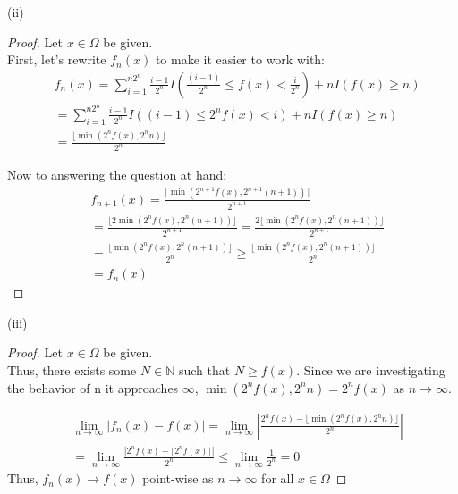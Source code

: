 \documentclass[12pt,letterpaper, onecolumn]{exam}
\newcommand{\nat}{\mathbb{N}}
\newcommand{\cutelim}{\lim\limits_{n\to\infty}}
\begin{document}
\begin{questions}
\begin{solution}
        (ii) 
        \begin{proof}
            Let $x \in \Omega$ be given. \\
            First, let's rewrite $f_n(x)$ to make it easier to work with:
            \begin{align*}
                &f_n(x) = \sum_{i = 1}^{n2^n} \frac{i - 1}{2^n} I(\frac{(i - 1)}{2^n} \leq f(x) < \frac{i}{2^n}) + n I(f(x) \geq n) \\
                & = \sum_{i = 1}^{n2^n} \frac{i - 1}{2^n} I((i - 1) \leq 2^nf(x) < i) + n I(f(x) \geq n) \\
                & = \frac{\lfloor \min(2^n f(x), 2^n n)\rfloor}{2^n}
            \end{align*}

            Now to answering the question at hand: 
            \begin{align*}
                &f_{n+1}(x) = \frac{\lfloor \min(2^{n+1} f(x), 2^{n+1} (n+1))\rfloor}{2^{n+1}} \\
                & = \frac{\lfloor 2\min(2^{n} f(x), 2^{n} (n+1))\rfloor}{2^{n+1}} = \frac{2\lfloor\min(2^{n} f(x), 2^{n} (n+1))\rfloor}{2^{n+1}} \\
                & = \frac{\lfloor\min(2^{n} f(x), 2^{n} (n+1))\rfloor}{2^{n}} \geq \frac{\lfloor\min(2^{n} f(x), 2^{n} (n+1))\rfloor}{2^{n}} \\
                & = f_n(x) 
            \end{align*}
        \end{proof}
        (iii) 
        \begin{proof}
            Let $x \in \Omega$ be given. \\
            Thus, there exists some $N \in \nat$ such that $N \geq f(x)$. Since we are investigating the behavior of n it approaches $\infty$, $\min(2^nf(x), 2^n n) = 2^n f(x)$ as $n \to \infty.$

            \begin{align*}
            & \lim\limits_{n \to \infty} |f_n(x) - f(x)| = \cutelim \left|\frac{2^n f(x) -  \lfloor \min(2^n f(x), 2^n n)\rfloor}{2^n}\right| \\
            & = \cutelim \frac{|2^n f(x) -  \lfloor 2^n f(x)\rfloor|}{2^n} \leq \cutelim \frac{1}{2^n} = 0
            \end{align*}
            Thus, $f_n(x) \to f(x)$ point-wise as $n \to \infty$ for all $x \in \Omega$

           
        \end{proof}
    \end{solution}


\end{questions}
\end{document}

